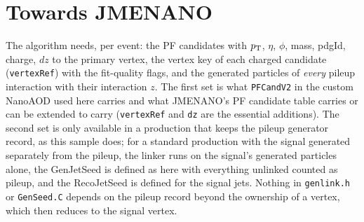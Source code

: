 \section{Towards JMENANO}
\label{s:jmenano}

The algorithm needs, per event: the PF candidates with $p_{\mathrm{T}}$, $\eta$, $\phi$,
mass, pdgId, charge, $dz$ to the primary vertex, the vertex key of each charged
candidate (\texttt{vertexRef}) with the fit-quality flags, and the generated
particles of \emph{every} pileup interaction with their interaction $z$. The
first set is what \texttt{PFCandV2} in the custom NanoAOD used here carries
and what JMENANO's PF candidate table carries or can be extended to carry
(\texttt{vertexRef} and \texttt{dz} are the essential additions). The second
set is only available in a production that keeps the pileup generator record,
as this sample does; for a standard production with the signal generated
separately from the pileup, the linker runs on the signal's generated particles
alone, the GenJetSeed is defined as here with everything unlinked counted as
pileup, and the RecoJetSeed is defined for the signal jets. Nothing in
\texttt{genlink.h} or \texttt{GenSeed.C} depends on the pileup record beyond
the ownership of a vertex, which then reduces to the signal vertex.
